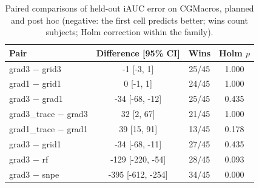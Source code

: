 \begin{table}[t]
\centering\small
\begin{tabular}{lccc}
\toprule
Pair & Difference [95\% CI] & Wins & Holm $p$ \\
\midrule
grad3 $-$ grid3 & -1 [-3, 1] & 25/45 & 1.000 \\
grad1 $-$ grid1 & 0 [-1, 1] & 24/45 & 1.000 \\
grad3 $-$ grad1 & -34 [-68, -12] & 25/45 & 0.435 \\
grad3\_trace $-$ grad3 & 32 [2, 67] & 21/45 & 1.000 \\
grad1\_trace $-$ grad1 & 39 [15, 91] & 13/45 & 0.178 \\
grad3 $-$ grid1 & -34 [-68, -11] & 27/45 & 0.435 \\
grad3 $-$ rf & -129 [-220, -54] & 28/45 & 0.093 \\
grad3 $-$ snpe & -395 [-612, -254] & 34/45 & 0.000 \\
\bottomrule
\end{tabular}
\caption{Paired comparisons of held-out iAUC error on CGMacros, planned and post hoc (negative: the first cell predicts better; wins count subjects; Holm correction within the family).}
\label{tab:comparisons}
\end{table}

